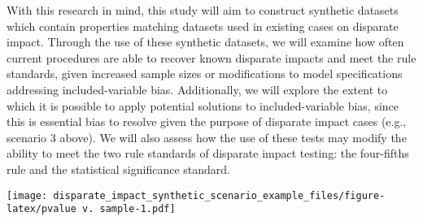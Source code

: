 \documentclass[
]{article}
\begin{document}
With this research in mind, this study will aim to construct synthetic
datasets which contain properties matching datasets used in existing
cases on disparate impact. Through the use of these synthetic datasets,
we will examine how often current procedures are able to recover known
disparate impacts and meet the rule standards, given increased sample
sizes or modifications to model specifications addressing
included-variable bias. Additionally, we will explore the extent to
which it is possible to apply potential solutions to included-variable
bias, since this is essential bias to resolve given the purpose of
disparate impact cases (e.g., scenario 3 above). We will also assess how
the use of these tests may modify the ability to meet the two rule
standards of disparate impact testing: the four-fifths rule and the
statistical significance standard.

\texttt{[image: disparate\_impact\_synthetic\_scenario\_example\_files/figure-latex/pvalue v. sample-1.pdf]}
\end{document}
